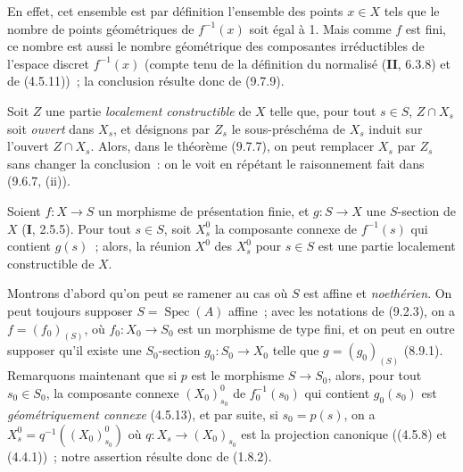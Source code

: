 En effet, cet ensemble est par définition l'ensemble des points $x\in X$ tels
que le nombre de points géométriques de $f^{-1}(x)$ soit égal à 1. Mais comme
$f$ est fini, ce nombre est aussi le nombre géométrique des composantes
irréductibles de l'espace discret $f^{-1}(x)$ (compte tenu de la définition du
normalisé (\textbf{II}, 6.3.8) et de (4.5.11))~; la conclusion résulte donc de
(9.7.9).

\begin{remark}[9.7.11]
\label{IV.9.7.11-fr}
Soit $Z$ une partie \emph{localement constructible} de $X$ telle que, pour tout
$s\in S$, $Z\cap X_s$ soit \emph{ouvert} dans $X_s$, et désignons par $Z_s$ le
sous-préschéma de $X_s$ induit
sur l'ouvert $Z\cap X_s$. Alors, dans le théorème (9.7.7), on peut remplacer
$X_s$ par $Z_s$ sans changer la conclusion~: on le voit en répétant le
raisonnement fait dans (9.6.7, (ii)).
\end{remark}

\begin{proposition}[9.7.12]
\label{IV.9.7.12-fr}
Soient $f:X\to S$ un morphisme de présentation finie, et $g:S\to X$ une
$S$-section de $X$ \textup{(\textbf{I}, 2.5.5)}. Pour tout $s\in S$, soit $X_s^0$ la
composante connexe de $f^{-1}(s)$ qui contient $g(s)$~; alors, la réunion $X^0$
des $X_s^0$ pour $s\in S$ est une partie localement constructible de $X$.
\end{proposition}

Montrons d'abord qu'on peut se ramener au cas où $S$ est affine et
\emph{noethérien}. On peut toujours supposer $S=\operatorname{Spec}(A)$ affine~;
avec les notations de (9.2.3), on a $f=(f_0)_{(S)}$, où $f_0:X_0\to S_0$ est un
morphisme de type fini, et on peut en outre supposer qu'il existe une
$S_0$-section $g_0:S_0\to X_0$ telle que $g=(g_0)_{(S)}$ (8.9.1). Remarquons
maintenant que si $p$ est le morphisme $S\to S_0$, alors, pour tout $s_0\in S_0$,
la composante connexe $(X_0)^0_{s_0}$ de $f_0^{-1}(s_0)$ qui contient $g_0(s_0)$
est \emph{géométriquement connexe} (4.5.13), et par suite, si $s_0=p(s)$, on a
$X_s^0=q^{-1}((X_0)^0_{s_0})$ où $q:X_s\to(X_0)_{s_0}$ est la projection
canonique ((4.5.8) et (4.4.1))~; notre assertion résulte donc de (1.8.2).

